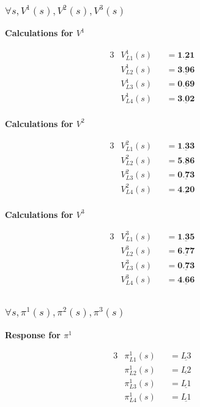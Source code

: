 \documentclass[12pt, letterpaper]{article}
\begin{document}
\subsubsection{$\forall s,V^1(s),V^2(s),V^3(s)$}

\textbf{Calculations for $V^1$}

\begin{alignat*}{3}
    &V^1_{L1}(s) &&= \underline{\textbf{1.21}} && \\
    &V^1_{L2}(s) &&= \underline{\textbf{3.96}} && \\
    &V^1_{L3}(s) &&= \underline{\textbf{0.69}} && \\
    &V^1_{L4}(s) &&= \underline{\textbf{3.02}} && \\
\end{alignat*}

\textbf{Calculations for $V^2$}

\begin{alignat*}{3}
    &V^2_{L1}(s) &&= \underline{\textbf{1.33}} && \\
    &V^2_{L2}(s) &&= \underline{\textbf{5.86}} && \\
    &V^2_{L3}(s) &&= \underline{\textbf{0.73}} && \\
    &V^2_{L4}(s) &&= \underline{\textbf{4.20}} && \\
\end{alignat*}

\textbf{Calculations for $V^3$}

\begin{alignat*}{3}
    &V^3_{L1}(s) &&= \underline{\textbf{1.35}} && \\
    &V^3_{L2}(s) &&= \underline{\textbf{6.77}} && \\
    &V^3_{L3}(s) &&= \underline{\textbf{0.73}} && \\
    &V^3_{L4}(s) &&= \underline{\textbf{4.66}} && \\
\end{alignat*}

\subsubsection{$\forall s,\pi^1(s),\pi^2(s),\pi^3(s)$}

\textbf{Response for $\pi^1$}

\begin{alignat*}{3}
    &\pi^1_{L1}(s) &&= \underline{\textbf{$L3$}} && \\
    &\pi^1_{L2}(s) &&= \underline{\textbf{$L2$}} && \\
    &\pi^1_{L3}(s) &&= \underline{\textbf{$L1$}} && \\
    &\pi^1_{L4}(s) &&= \underline{\textbf{$L1$}} && \\
\end{alignat*}
\end{document}
